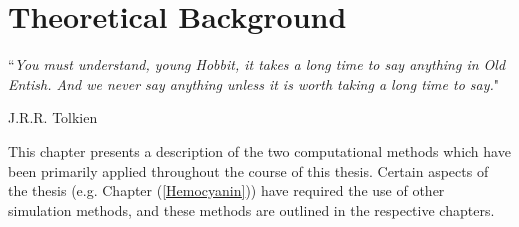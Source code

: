 \chapter{Theoretical Background}
\label{Introduction}
%
\epigraph{``\textit{You must understand, young Hobbit, it takes a long time to say anything in Old Entish. And we never say anything unless it is worth taking a long time to say.}"}{J.R.R. Tolkien}
%
This chapter presents a description of the two computational methods which have been primarily applied throughout the course of this thesis. Certain aspects of the thesis (e.g. Chapter (\ref{Hemocyanin})) have required the use of other simulation methods, and these methods are outlined in the respective chapters.
